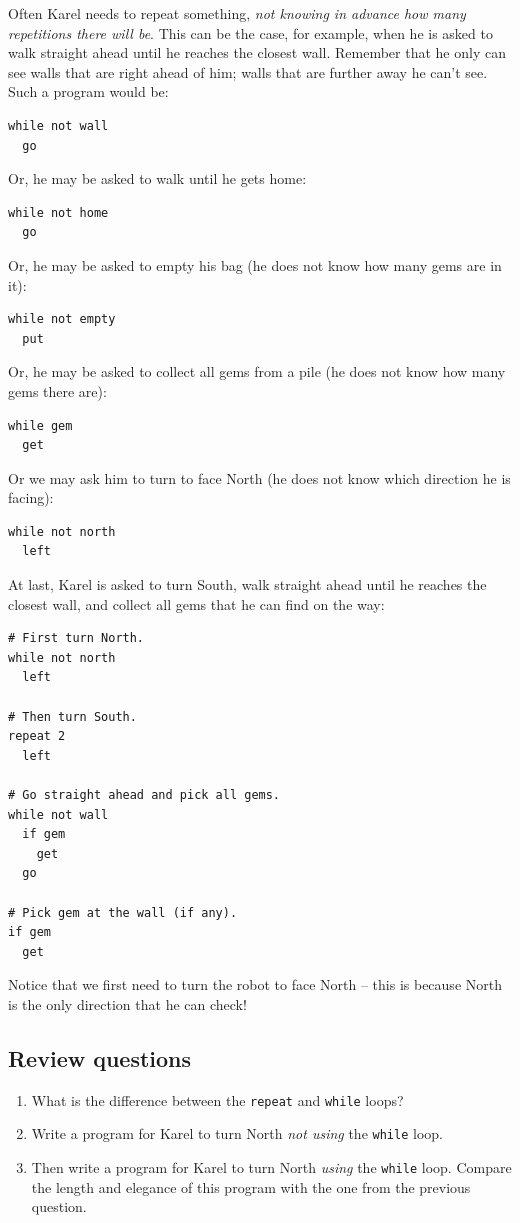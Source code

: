 \documentclass[article,A4,12pt]{llncs}
\begin{document}
Often Karel needs to repeat something, {\em not knowing in advance how many repetitions
there will be}. This can be the case, for example, 
when he is asked to walk straight ahead until he reaches the closest wall.
Remember that he only can see walls that are right ahead of him; walls 
that are further away he can't see. Such a program would be:

\begin{verbatim}
while not wall
  go
\end{verbatim}
Or, he may be asked to walk until he gets home:

\begin{verbatim}
while not home
  go
\end{verbatim}
Or, he may be asked to empty his bag (he does not know how many gems are in it): 
 
\begin{verbatim}
while not empty
  put
\end{verbatim}
Or, he may be asked to collect all gems from a pile (he does not know 
how many gems there are):

\begin{verbatim}
while gem
  get
\end{verbatim}
Or we may ask him to turn to face North (he does not know which direction he is
facing):

\begin{verbatim}
while not north
  left
\end{verbatim}
At last, Karel is asked to 
turn South, walk straight ahead until he reaches the closest wall, and 
collect all gems that he can find on the way:

\begin{verbatim}
# First turn North.
while not north
  left

# Then turn South.
repeat 2
  left

# Go straight ahead and pick all gems.
while not wall
  if gem
    get
  go

# Pick gem at the wall (if any).
if gem
  get
\end{verbatim}
Notice that we first need to turn the robot to face North -- this is because North 
is the only direction that he can check!

\subsection{Review questions}

\begin{enumerate}
\item What is the difference between the {\tt repeat} and {\tt while} loops?
\item Write a program for Karel to turn North {\em not using} the {\tt while} loop. 
\item Then write a program for Karel to turn North {\em using} the {\tt while} loop. 
      Compare the length and elegance of this program with the one from the 
      previous question.
\end{enumerate}
\end{document}
